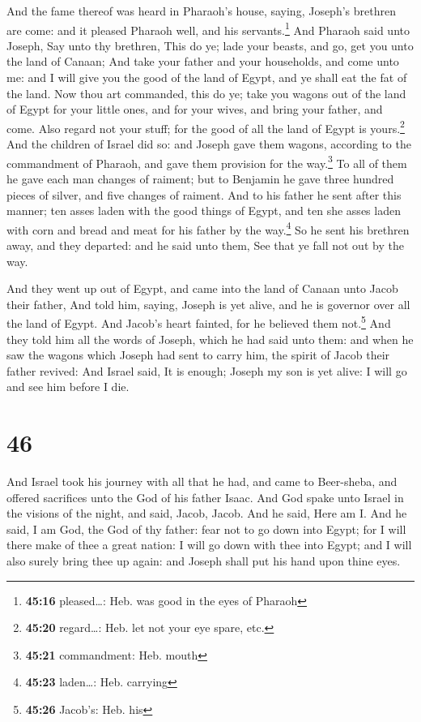  And the fame thereof was heard in Pharaoh's house,
saying, Joseph's brethren are come: and it pleased Pharaoh well, and his
servants.\footnote{\textbf{45:16} pleased\ldots: Heb. was good in the
  eyes of Pharaoh}  And Pharaoh said unto Joseph, Say
unto thy brethren, This do ye; lade your beasts, and go, get you unto
the land of Canaan;  And take your father and your
households, and come unto me: and I will give you the good of the land
of Egypt, and ye shall eat the fat of the land.  Now thou
art commanded, this do ye; take you wagons out of the land of Egypt for
your little ones, and for your wives, and bring your father, and come.
 Also regard not your stuff; for the good of all the land
of Egypt is yours.\footnote{\textbf{45:20} regard\ldots: Heb. let not
  your eye spare, etc.}  And the children of Israel did
so: and Joseph gave them wagons, according to the commandment of
Pharaoh, and gave them provision for the way.\footnote{\textbf{45:21}
  commandment: Heb. mouth}  To all of them he gave each
man changes of raiment; but to Benjamin he gave three hundred pieces of
silver, and five changes of raiment.  And to his father
he sent after this manner; ten asses laden with the good things of
Egypt, and ten she asses laden with corn and bread and meat for his
father by the way.\footnote{\textbf{45:23} laden\ldots: Heb. carrying}
 So he sent his brethren away, and they departed: and he
said unto them, See that ye fall not out by the way.

 And they went up out of Egypt, and came into the land of
Canaan unto Jacob their father,  And told him, saying,
Joseph is yet alive, and he is governor over all the land of Egypt. And
Jacob's heart fainted, for he believed them not.\footnote{\textbf{45:26}
  Jacob's: Heb. his}  And they told him all the words of
Joseph, which he had said unto them: and when he saw the wagons which
Joseph had sent to carry him, the spirit of Jacob their father revived:
 And Israel said, It is enough; Joseph my son is yet
alive: I will go and see him before I die.

\hypertarget{section-45}{%
\section{46}\label{section-45}}

 And Israel took his journey with all that he had, and
came to Beer-sheba, and offered sacrifices unto the God of his father
Isaac.  And God spake unto Israel in the visions of the
night, and said, Jacob, Jacob. And he said, Here am I. 
And he said, I am God, the God of thy father: fear not to go down into
Egypt; for I will there make of thee a great nation:  I
will go down with thee into Egypt; and I will also surely bring thee up
again: and Joseph shall put his hand upon thine eyes.

